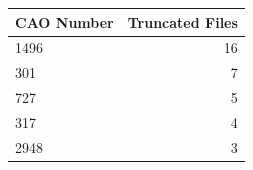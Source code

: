 \begin{tabular}{lr}
    \hline\hline
    CAO Number & Truncated Files \\
    \hline
    1496 & 16 \\
    301 & 7 \\
    727 & 5 \\
    317 & 4 \\
    2948 & 3 \\
    \hline\hline
\end{tabular}
